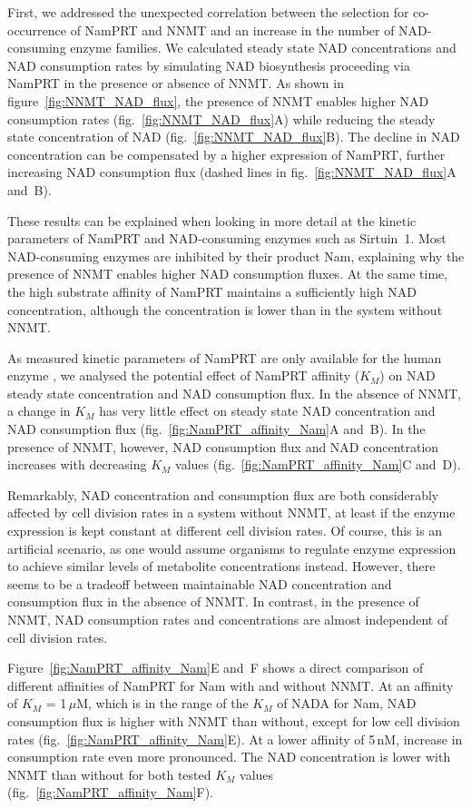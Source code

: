 First, we addressed the unexpected correlation between the selection for co-occurrence of NamPRT and NNMT and an increase in the number of NAD-consuming enzyme families. We calculated steady state NAD concentrations and NAD consumption rates by simulating NAD biosynthesis proceeding via NamPRT in the presence or absence of NNMT. As shown in figure~\ref{fig:NNMT_NAD_flux}, the presence of NNMT enables higher NAD consumption rates (fig.~\ref{fig:NNMT_NAD_flux}A) while reducing the steady state concentration of NAD (fig.~\ref{fig:NNMT_NAD_flux}B). The decline in NAD concentration can be compensated by a higher expression of NamPRT, further increasing NAD consumption flux (dashed lines in fig.~\ref{fig:NNMT_NAD_flux}A and~B).

These results can be explained when looking in more detail at the kinetic parameters of NamPRT and NAD-consuming enzymes such as Sirtuin~1. Most NAD-consuming enzymes are inhibited by their product Nam, explaining why the presence of NNMT enables higher NAD consumption fluxes. At the same time, the high substrate affinity of NamPRT maintains a sufficiently high NAD concentration, although the concentration is lower than in the system without NNMT.

As measured kinetic parameters of NamPRT are only available for the human enzyme \cite{Burgos2008}, we analysed the potential effect of NamPRT affinity ($K_{M}$) on NAD steady state concentration and NAD consumption flux. In the absence of NNMT, a change in $K_{M}$ has very little effect on steady state NAD concentration and NAD consumption flux (fig.~\ref{fig:NamPRT_affinity_Nam}A and~B). In the presence of NNMT, however, NAD consumption flux and NAD concentration increases with decreasing $K_{M}$ values (fig.~\ref{fig:NamPRT_affinity_Nam}C and~D).

Remarkably, NAD concentration and consumption flux are both considerably affected by cell division rates in a system without NNMT, at least if the enzyme expression is kept constant at different cell division rates. Of course, this is an artificial scenario, as one would assume organisms to regulate enzyme expression to achieve similar levels of metabolite concentrations instead. However, there seems to be a tradeoff between maintainable NAD concentration and consumption flux in the absence of NNMT. In contrast, in the presence of NNMT, NAD consumption rates and concentrations are almost independent of cell division rates.

Figure~\ref{fig:NamPRT_affinity_Nam}E and~F shows a direct comparison of different affinities of NamPRT for Nam with and without NNMT. At an affinity of $K_{M}$ = 1\,$\mu$M, which is in the range of the $K_{M}$ of NADA for Nam, NAD consumption flux is higher with NNMT than without, except for low cell division rates (fig.~\ref{fig:NamPRT_affinity_Nam}E). At a lower affinity of 5\,nM, increase in consumption rate even more pronounced. The NAD concentration is lower with NNMT than without for both tested $K_{M}$ values (fig.~\ref{fig:NamPRT_affinity_Nam}F).

